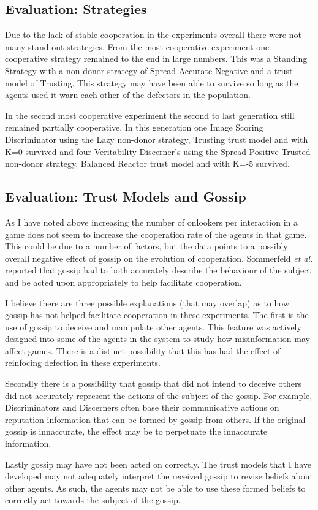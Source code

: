 \documentclass[]{final_report}
\begin{document}
\subsection{Evaluation: Strategies}
\label{subs:eval_strats}
Due to the lack of stable cooperation in the experiments overall there were not many stand out strategies. From the most cooperative experiment one cooperative strategy remained to the end in large numbers. This was a Standing Strategy with a non-donor strategy of Spread Accurate Negative and a trust model of Trusting. This strategy may have been able to survive so long as the agents used it warn each other of the defectors in the population.\par 
In the second most cooperative experiment the second to last generation still remained partially cooperative. In this generation one Image Scoring Discriminator using the Lazy non-donor strategy, Trusting trust model and with K=0 survived and four Veritability Discerner's using the Spread Positive Trusted non-donor strategy, Balanced Reactor trust model and with K=-5 survived.

\subsection{Evaluation: Trust Models and Gossip}
As I have noted above increasing the number of onlookers per interaction in a game does not seem to increase the cooperation rate of the agents in that game. This could be due to a number of factors, but the data points to a possibly overall negative effect of gossip on the evolution of cooperation. Sommerfeld \textit{et al.} reported that gossip had to both accurately describe the behaviour of the subject and be acted upon appropriately to help facilitate cooperation.\par 
I believe there are three possible explanations (that may overlap) as to how gossip has not helped facilitate cooperation in these experiments. The first is the use of gossip to deceive and manipulate other agents. This feature was actively designed into some of the agents in the system to study how misinformation may affect games. There is a distinct possibility that this has had the effect of reinfocing defection in these experiments.\par 
Secondly there is a possibility that gossip that did not intend to deceive others did not accurately represent the actions of the subject of the gossip. For example, Discriminators and Discerners often base their communicative actions on reputation information that can be formed by gossip from others. If the original gossip is innaccurate, the effect may be to perpetuate the innaccurate information.\par 
Lastly gossip may have not been acted on correctly. The trust models that I have developed may not adequately interpret the received gossip to revise beliefs about other agents. As such, the agents may not be able to use these formed beliefs to correctly act towards the subject of the gossip.
\end{document}
